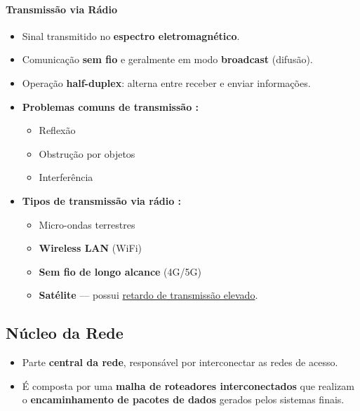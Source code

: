     \paragraph{Transmissão via Rádio}
    \begin{itemize}[left=0.5cm, align=left, nosep]
        \item Sinal transmitido no \textbf{espectro eletromagnético}.
        \item Comunicação \textbf{sem fio} e geralmente em modo \textbf{broadcast} (difusão).
        \item Operação \textbf{half-duplex}: alterna entre receber e enviar informações.
        \item \textbf{Problemas comuns de transmissão :}
        \begin{itemize}[left=0.5cm, nosep, label=$\hookrightarrow$]
            \item Reflexão 
            \item Obstrução por objetos 
            \item Interferência 
        \end{itemize} 
        
        \item \textbf{Tipos de transmissão via rádio :} 
        \begin{itemize}[left=0.5cm, nosep, label=$\hookrightarrow$]
            \item Micro-ondas terrestres 
            \item \textbf{Wireless LAN} (WiFi) 
            \item \textbf{Sem fio de longo alcance} (4G/5G) 
            \item \textbf{Satélite} — possui \underline{retardo de transmissão elevado}.
        \end{itemize} 
    \end{itemize}

    \subsection{Núcleo da Rede}

    \begin{itemize}[left=0.5cm, align=left, nosep]
        \item Parte \textbf{central da rede}, responsável por interconectar as redes de acesso.
        \item É composta por uma \textbf{malha de roteadores interconectados} que realizam o \textbf{encaminhamento de pacotes de dados} gerados pelos sistemas finais.
    \end{itemize}

